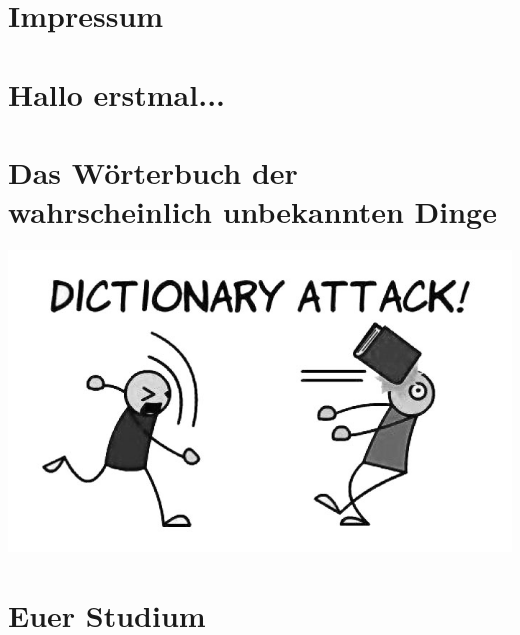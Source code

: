\documentclass[12pt,a4paper]{scrartcl}
\begin{document}


\tableofcontents
\newpage



\section{Impressum}

\newpage

\section{Hallo erstmal...}

\newpage

\label{glossar}
\section{Das Wörterbuch der wahrscheinlich unbekannten Dinge}

\begin{center}
	\includegraphics[scale=0.5]{comics/dictionary-attack}
\end{center}

\section{Euer Studium}
\end{document}

